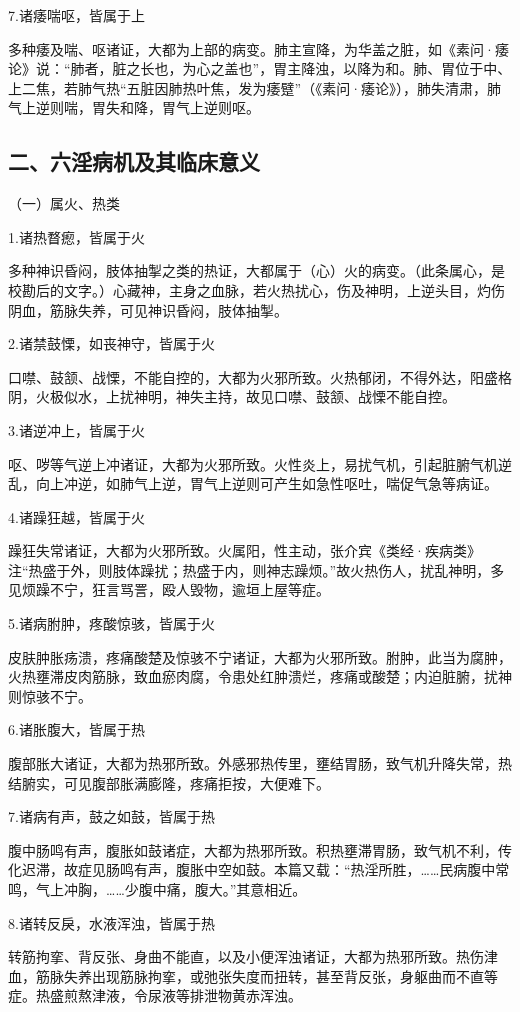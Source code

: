 \documentclass[draft,12pt]{ctexbook}
\begin{document}
7.诸痿喘呕，皆属于上

多种痿及喘、呕诸证，大都为上部的病变。肺主宣降，为华盖之脏，如《素问·痿论》说：“肺者，脏之长也，为心之盖也”，胃主降浊，以降为和。肺、胃位于中、上二焦，若肺气热“五脏因肺热叶焦，发为痿躄”（《素问·痿论》），肺失清肃，肺气上逆则喘，胃失和降，胃气上逆则呕。

\subsection*{二、六淫病机及其临床意义}

（一）属火、热类

1.诸热瞀瘛，皆属于火

多种神识昏闷，肢体抽掣之类的热证，大都属于（心）火的病变。（此条属心，是校勘后的文字。）心藏神，主身之血脉，若火热扰心，伤及神明，上逆头目，灼伤阴血，筋脉失养，可见神识昏闷，肢体抽掣。

2.诸禁鼓慄，如丧神守，皆属于火

口噤、鼓颔、战慄，不能自控的，大都为火邪所致。火热郁闭，不得外达，阳盛格阴，火极似水，上扰神明，神失主持，故见口噤、鼓颔、战慄不能自控。

3.诸逆冲上，皆属于火

呕、哕等气逆上冲诸证，大都为火邪所致。火性炎上，易扰气机，引起脏腑气机逆乱，向上冲逆，如肺气上逆，胃气上逆则可产生如急性呕吐，喘促气急等病证。

4.诸躁狂越，皆属于火

躁狂失常诸证，大都为火邪所致。火属阳，性主动，张介宾《类经·疾病类》注“热盛于外，则肢体躁扰；热盛于内，则神志躁烦。”故火热伤人，扰乱神明，多见烦躁不宁，狂言骂詈，殴人毁物，逾垣上屋等症。

5.诸病胕肿，疼酸惊骇，皆属于火

皮肤肿胀疡溃，疼痛酸楚及惊骇不宁诸证，大都为火邪所致。胕肿，此当为腐肿，火热壅滞皮肉筋脉，致血瘀肉腐，令患处红肿溃烂，疼痛或酸楚；内迫脏腑，扰神则惊骇不宁。

6.诸胀腹大，皆属于热

腹部胀大诸证，大都为热邪所致。外感邪热传里，壅结胃肠，致气机升降失常，热结腑实，可见腹部胀满膨隆，疼痛拒按，大便难下。

7.诸病有声，鼓之如鼓，皆属于热

腹中肠鸣有声，腹胀如鼓诸症，大都为热邪所致。积热壅滞胃肠，致气机不利，传化迟滞，故症见肠鸣有声，腹胀中空如鼓。本篇又载：“热淫所胜，……民病腹中常鸣，气上冲胸，……少腹中痛，腹大。”其意相近。

8.诸转反戾，水液浑浊，皆属于热

转筋拘挛、背反张、身曲不能直，以及小便浑浊诸证，大都为热邪所致。热伤津血，筋脉失养出现筋脉拘挛，或弛张失度而扭转，甚至背反张，身躯曲而不直等症。热盛煎熬津液，令尿液等排泄物黄赤浑浊。
\end{document}
